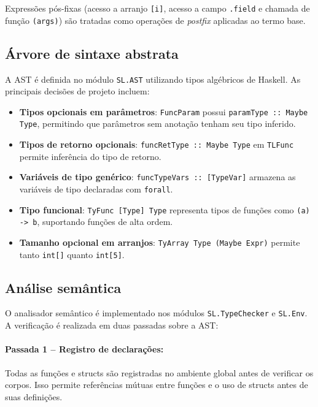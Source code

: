 \documentclass[12pt,a4paper]{article}
\begin{document}
Expressões pós-fixas (acesso a arranjo \texttt{[i]}, acesso a campo \texttt{.field} e chamada de função \texttt{(args)}) são tratadas como operações de \textit{postfix} aplicadas ao termo base.

\subsection{Árvore de sintaxe abstrata}

A AST é definida no módulo \texttt{SL.AST} utilizando tipos algébricos de Haskell. As principais decisões de projeto incluem:

\begin{itemize}
    \item \textbf{Tipos opcionais em parâmetros}: \texttt{FuncParam} possui \texttt{paramType :: Maybe Type}, permitindo que parâmetros sem anotação tenham seu tipo inferido.
    \item \textbf{Tipos de retorno opcionais}: \texttt{funcRetType :: Maybe Type} em \texttt{TLFunc} permite inferência do tipo de retorno.
    \item \textbf{Variáveis de tipo genérico}: \texttt{funcTypeVars :: [TypeVar]} armazena as variáveis de tipo declaradas com \texttt{forall}.
    \item \textbf{Tipo funcional}: \texttt{TyFunc [Type] Type} representa tipos de funções como \texttt{(a) -> b}, suportando funções de alta ordem.
    \item \textbf{Tamanho opcional em arranjos}: \texttt{TyArray Type (Maybe Expr)} permite tanto \texttt{int[]} quanto \texttt{int[5]}.
\end{itemize}

\subsection{Análise semântica}

O analisador semântico é implementado nos módulos \texttt{SL.TypeChecker} e \texttt{SL.Env}. A verificação é realizada em duas passadas sobre a AST:

\paragraph{Passada 1 -- Registro de declarações:} Todas as funções e structs são registradas no ambiente global antes de verificar os corpos. Isso permite referências mútuas entre funções e o uso de structs antes de suas definições.
\end{document}
